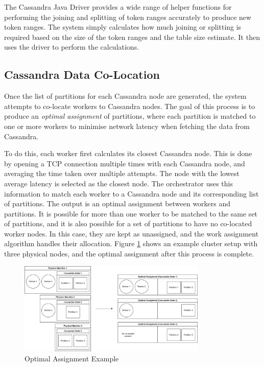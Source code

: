 The Cassandra Java Driver provides a wide range of helper functions for performing the joining and splitting of token ranges accurately to produce new token ranges. The system simply calculates how much joining or splitting is required based on the size of the token ranges and the table size estimate. It then uses the driver to perform the calculations.

\subsection{Cassandra Data Co-Location}\label{subsec:colocation}
Once the list of partitions for each Cassandra node are generated, the system attempts to co-locate workers to Cassandra nodes. The goal of this process is to produce an \textit{optimal assignment} of partitions, where each partition is matched to one or more workers to minimise network latency when fetching the data from Cassandra.

To do this, each worker first calculates its closest Cassandra node. This is done by opening a TCP connection multiple times with each Cassandra node, and averaging the time taken over multiple attempts. The node with the lowest average latency is selected as the closest node. The orchestrator uses this information to match each worker to a Cassandra node and its corresponding list of partitions. The output is an optimal assignment between workers and partitions. It is possible for more than one worker to be matched to the same set of partitions, and it is also possible for a set of partitions to have no co-located worker nodes. In this case, they are kept as unassigned, and the work assignment algorithm handles their allocation. Figure \ref{fig:optimal-assignment-example} shows an example cluster setup with three physical nodes, and the optimal assignment after this process is complete.

\begin{figure}[h]
	\centering
	\includegraphics[width=0.8\textwidth]{chapters/diagrams/implementation/optimal-assignment-example}
	\caption{Optimal Assignment Example}
	\label{fig:optimal-assignment-example}
\end{figure}

